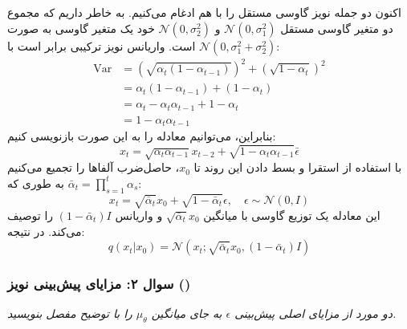 \begin{solutionbox}
    اکنون دو جمله نویز گاوسی مستقل را با هم ادغام می‌کنیم. به خاطر داریم که مجموع دو متغیر گاوسی مستقل $\mathcal{N}(0, \sigma_1^2)$ و $\mathcal{N}(0, \sigma_2^2)$ خود یک متغیر گاوسی به صورت $\mathcal{N}(0, \sigma_1^2 + \sigma_2^2)$ است. واریانس نویز ترکیبی برابر است با:
    \begin{align*}
        \text{Var} &= (\sqrt{\alpha_t (1 - \alpha_{t-1})})^2 + (\sqrt{1 - \alpha_t})^2 \\
        &= \alpha_t (1 - \alpha_{t-1}) + (1 - \alpha_t) \\
        &= \alpha_t - \alpha_t \alpha_{t-1} + 1 - \alpha_t \\
        &= 1 - \alpha_t \alpha_{t-1}
    \end{align*}
    بنابراین، می‌توانیم معادله را به این صورت بازنویسی کنیم:
    \begin{equation}
        x_t = \sqrt{\alpha_t \alpha_{t-1}} x_{t-2} + \sqrt{1 - \alpha_t \alpha_{t-1}} \bar{\epsilon}
    \end{equation}
    با استفاده از استقرا و بسط دادن این روند تا $x_0$، حاصل‌ضرب آلفاها را تجمیع می‌کنیم به طوری که $\bar{\alpha}_t = \prod_{s=1}^t \alpha_s$:
    \begin{equation}
        x_t = \sqrt{\bar{\alpha}_t} x_0 + \sqrt{1 - \bar{\alpha}_t} \epsilon, \quad \epsilon \sim \mathcal{N}(0, I)
    \end{equation}
    این معادله یک توزیع گاوسی با میانگین $\sqrt{\bar{\alpha}_t} x_0$ و واریانس $(1 - \bar{\alpha}_t) I$ را توصیف می‌کند. در نتیجه:
    \begin{equation}
        q(x_t | x_0) = \mathcal{N}(x_t; \sqrt{\bar{\alpha}_t} x_0, (1 - \bar{\alpha}_t) I)
    \end{equation}
\end{solutionbox}


\subsubsection{سوال ۲: مزایای پیش‌بینی نویز ()}
\textit{دو مورد از مزایای اصلی پیش‌بینی $\epsilon$ به جای میانگین $\mu_\theta$ را با توضیح مفصل بنویسید.}

